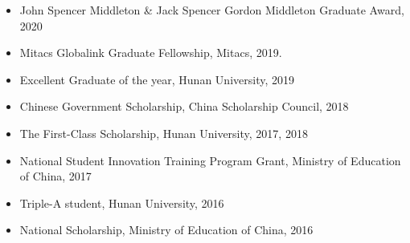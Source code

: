 \documentclass[a4paper, 11pt]{article}  %
\begin{document}
\begin{itemize}
	\itemsep0em 
	
	\item{John Spencer Middleton \& Jack Spencer Gordon Middleton Graduate Award, 2020}
	\item{Mitacs Globalink Graduate Fellowship, Mitacs, 2019.}
	\item{Excellent Graduate of the year, Hunan University, 2019}
	\item{Chinese Government Scholarship, China Scholarship Council, 2018}
	\item{The First-Class Scholarship, Hunan University, 2017, 2018}
	\item{National Student Innovation Training Program Grant, Ministry of Education of China, 2017}
	\item{Triple-A student, Hunan University, 2016}
	\item{National Scholarship, Ministry of Education of China, 2016}
	
\end{itemize}

\end{document}
